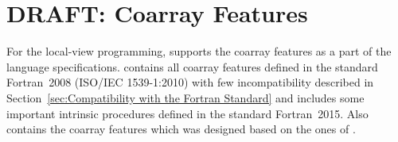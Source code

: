 \chapter{DRAFT: Coarray Features}
\label{chap:DRAFT: Coarray Features}

\newcommand{\onlyF}{{\tt [F]}} 
\newcommand{\onlyC}{{\tt [C]}} 

\newenvironment{Constraints}{\subsubsection*{Constraints}
 \begin{enumerate}}{\end{enumerate}}
\newenvironment{Constraints F}{\subsubsection*{Constraints {\onlyF}}
 \begin{enumerate}}{\end{enumerate}}
\newenvironment{Constraints C}{\subsubsection*{Constraints {\onlyC}}
 \begin{enumerate}}{\end{enumerate}}

\newenvironment{Restriction}{\subsubsection*{Restriction}
 \begin{itemize}}{\end{itemize}}

\newcommand{\NEW}[1]{\mytextcolor{red}{#1}}



\bigskip


For the local-view programming, {\XMP} supports the coarray features
as a part of the language specifications.
{\XMPF} contains all coarray features defined in the standard Fortran~2008
(ISO/IEC 1539-1:2010) with few incompatibility described in 
Section~\ref{sec:Compatibility with the Fortran Standard}
and includes some important intrinsic procedures defined in 
the standard Fortran~2015.
Also {\XMPC} contains the coarray features which was designed based on
the ones of {\XMPF}.


